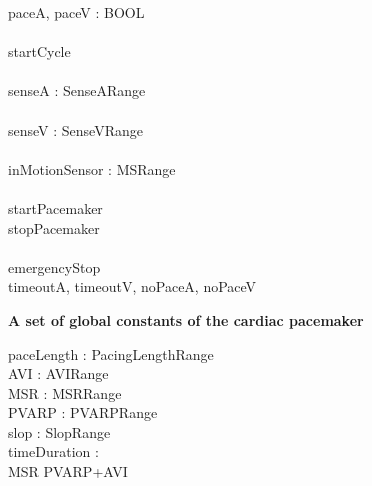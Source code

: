 \begin{circus}
  \circchannel paceA, paceV : BOOL\\

  \\

  \circchannel startCycle \\

  \\

  \circchannel senseA :  SenseARange\\

  \\

  \circchannel senseV :  SenseVRange\\

  \\
    
  \circchannel inMotionSensor : MSRange\\
  
  \\

  \circchannel startPacemaker \\
  \circchannel stopPacemaker \\

  \\
  
  \circchannel emergencyStop \\
  
  \circchannel timeoutA, timeoutV, noPaceA, noPaceV\\
  
\end{circus}





\hline
\textbf{A set of global constants of the cardiac pacemaker}
\hline
\begin{axdef}
  paceLength : PacingLengthRange\\
  AVI : AVIRange \\
  MSR : MSRRange \\
  PVARP : PVARPRange \\
  slop  : SlopRange  \\
  timeDuration : \nat
  \where \\
  MSR \geq PVARP+AVI
\end{axdef}


